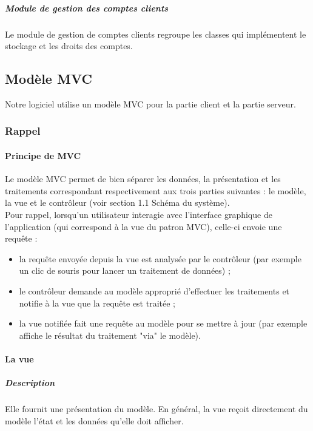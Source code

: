 \documentclass[10pt,a4paper]{report}
\begin{document}
				\subparagraph{Module de gestion des comptes clients}
				\begin{flushleft}
					Le module de gestion de comptes clients regroupe les classes qui implémentent le stockage et les droits des comptes.
				\end{flushleft}
				
				
	\subsection{Modèle MVC}
		Notre logiciel utilise un modèle MVC pour la partie client et la partie serveur.
		\subsubsection{Rappel}
			
			\paragraph{Principe de MVC}
			\begin{flushleft}

			Le modèle MVC permet de bien séparer les données, la présentation et les traitements correspondant respectivement aux trois parties suivantes : le modèle, la vue et le contrôleur (voir section 1.1 Schéma du système).\\
Pour rappel, lorsqu'un utilisateur interagie avec l'interface graphique de l'application (qui correspond à la vue du patron MVC), celle-ci envoie une requête  :
				\begin{itemize}
					\item la requête envoyée depuis la vue est analysée par le contrôleur (par exemple un clic de souris pour lancer un traitement de données) ;
    				\item le contrôleur demande au modèle approprié d'effectuer les traitements et notifie à la vue que la requête est traitée ;
    				\item la vue notifiée fait une requête au modèle pour se mettre à jour (par exemple affiche le résultat du traitement "via" le modèle).

				\end{itemize}
			\end{flushleft}
			
		\paragraph{La vue}
			\subparagraph{Description}
			\begin{flushleft}
				Elle fournit une présentation du modèle. En général, la vue reçoit directement du modèle l’état et les données qu’elle doit afficher.
			\end{flushleft}
			
\end{document}
